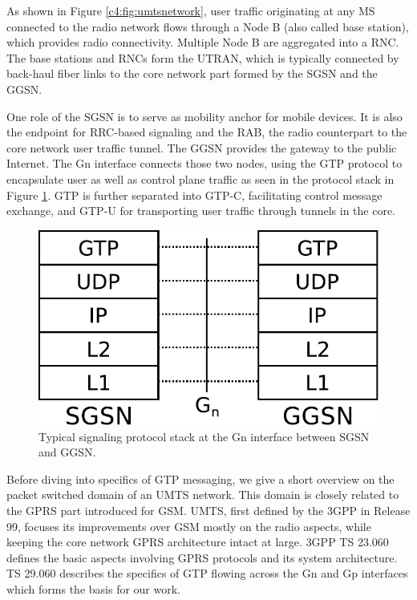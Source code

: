 As shown in Figure \ref{c4:fig:umtsnetwork}, user traffic originating at any \gls{MS} connected to the radio network flows through a Node B (also called base station), which provides radio connectivity. Multiple Node B are aggregated into a \gls{RNC}. The base stations and \glspl{RNC} form the \gls{UTRAN}, which is typically connected by back-haul fiber links to the core network part formed by the \gls{SGSN} and the \gls{GGSN}.

One role of the \gls{SGSN} is to serve as mobility anchor for mobile devices. It is also the endpoint for \gls{RRC}-based signaling and the \gls{RAB}, the radio counterpart to the core network user traffic tunnel. The \gls{GGSN} provides the gateway to the public Internet. The Gn interface connects those two nodes, using the \gls{GTP} protocol to encapsulate user as well as control plane traffic as seen in the protocol stack in Figure \ref{c4:fig:signallingstack}. \gls{GTP} is further separated into GTP-C, facilitating control message exchange, and GTP-U for transporting user traffic through tunnels in the core.

\begin{figure}[htb]
	\centering
	\includegraphics[width=0.6\columnwidth]{images/signalling-stack.pdf}
	\caption{Typical signaling protocol stack at the Gn interface between \gls{SGSN} and \gls{GGSN}.}
	\label{c4:fig:signallingstack}
\end{figure}


Before diving into specifics of \gls{GTP} messaging, we give a short overview on the packet switched domain of an \gls{UMTS} network. This domain is closely related to the \gls{GPRS} part introduced for \acrshort{GSM}. \gls{UMTS}, first defined by the \gls{3GPP} in Release 99, focuses its improvements over \gls{GSM} mostly on the radio aspects, while keeping the core network \gls{GPRS} architecture intact at large. \gls{3GPP} \gls{TS} 23.060 \cite{3gpp.23.060} defines the basic aspects involving \gls{GPRS} protocols and its system architecture. \gls{TS} 29.060 \cite{3gpp.29.060} describes the specifics of \gls{GTP} flowing across the Gn and Gp interfaces which forms the basis for our work.

